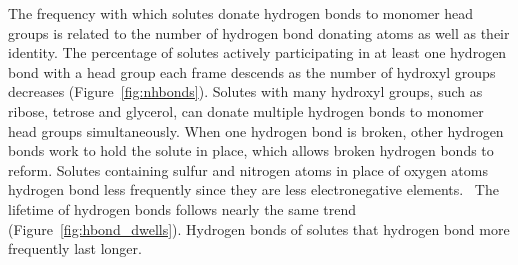 \documentclass{article}
\begin{document}
  The frequency with which solutes donate hydrogen bonds to monomer head 
  groups is related to the number of hydrogen bond donating atoms as well
  as their identity. The percentage of solutes actively participating in
  at least one hydrogen bond with a head group each frame descends as the
  number of hydroxyl groups decreases (Figure~\ref{fig:nhbonds}). Solutes with many hydroxyl groups,
  such as ribose, tetrose and glycerol, can donate multiple hydrogen bonds
  to monomer head groups simultaneously. When one hydrogen bond is broken,
  other hydrogen bonds work to hold the solute in place, which allows 
  broken hydrogen bonds to reform. Solutes containing sulfur and 
  nitrogen atoms in place of oxygen atoms hydrogen bond less frequently
  since they are less electronegative elements.~\cite{biswal_hydrogen_2015} %
  The lifetime of hydrogen bonds follows nearly the same trend 
  (Figure~\ref{fig:hbond_dwells}). Hydrogen bonds of solutes that hydrogen
  bond more frequently last longer.
  
\end{document}
